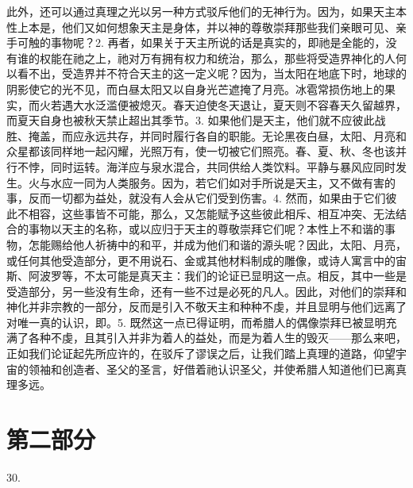 此外，还可以通过真理之光以另一种方式驳斥他们的无神行为。因为，如果天主本性上本是，他们又如何想象天主是身体，并以神的尊敬崇拜那些我们亲眼可见、亲手可触的事物呢？2. 再者，如果关于天主所说的话是真实的，即祂是全能的，没有谁的权能在祂之上，祂对万有拥有权力和统治，那么，那些将受造界神化的人何以看不出，受造界并不符合天主的这一定义呢？因为，当太阳在地底下时，地球的阴影使它的光不见，而白昼太阳又以自身光芒遮掩了月亮。冰雹常损伤地上的果实，而火若遇大水泛滥便被熄灭。春天迫使冬天退让，夏天则不容春天久留越界，而夏天自身也被秋天禁止超出其季节。3. 如果他们是天主，他们就不应彼此战胜、掩盖，而应永远共存，并同时履行各自的职能。无论黑夜白昼，太阳、月亮和众星都该同样地一起闪耀，光照万有，使一切被它们照亮。春、夏、秋、冬也该并行不悖，同时运转。海洋应与泉水混合，共同供给人类饮料。平静与暴风应同时发生。火与水应一同为人类服务。因为，若它们如对手所说是天主，又不做有害的事，反而一切都为益处，就没有人会从它们受到伤害。4. 然而，如果由于它们彼此不相容，这些事皆不可能，那么，又怎能赋予这些彼此相斥、相互冲突、无法结合的事物以天主的名称，或以应归于天主的尊敬崇拜它们呢？本性上不和谐的事物，怎能赐给他人祈祷中的和平，并成为他们和谐的源头呢？因此，太阳、月亮，或任何其他受造部分，更不用说石、金或其他材料制成的雕像，或诗人寓言中的宙斯、阿波罗等，不太可能是真天主：我们的论证已显明这一点。相反，其中一些是受造部分，另一些没有生命，还有一些不过是必死的凡人。因此，对他们的崇拜和神化并非宗教的一部分，反而是引入不敬天主和种种不虔，并且显明与他们远离了对唯一真的认识，即。5. 既然这一点已得证明，而希腊人的偶像崇拜已被显明充满了各种不虔，且其引入并非为着人的益处，而是为着人生的毁灭——那么来吧，正如我们论证起先所应许的，在驳斥了谬误之后，让我们踏上真理的道路，仰望宇宙的领袖和创造者、圣父的圣言，好借着祂认识圣父，并使希腊人知道他们已离真理多远。\par


\section{第二部分}

30. \par

